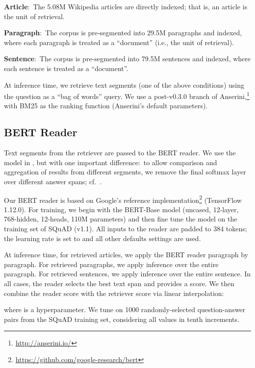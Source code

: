 \documentclass[11pt,a4paper]{article}
\begin{document}
\smallskip \noindent \textbf{Article}:\ The 5.08M Wikipedia articles are directly indexed; that is, an article is the unit of retrieval.

\smallskip \noindent \textbf{Paragraph}:\ The corpus is pre-segmented into 29.5M paragraphs and indexed, where each paragraph is treated as a ``document'' (i.e., the unit of retrieval).

\smallskip \noindent \textbf{Sentence}:\ The corpus is pre-segmented into 79.5M sentences and indexed, where each sentence is treated as a ``document''.

\smallskip \noindent At inference time, we retrieve  text segments (one of the above conditions) using the question as a ``bag of words'' query.
We use a post-v0.3.0 branch of Anserini,\footnote{\url{http://anserini.io/}} with BM25 as the ranking function (Anserini's default parameters).

\subsection{BERT Reader}

Text segments from the retriever are passed to the BERT reader.
We use the model in \citet{devlin2018bert}, but with one important difference:\ to allow comparison and aggregation of results from different segments, we remove the final softmax layer over different answer spans; cf.~\cite{P18-1078}.

Our BERT reader is based on Google's reference implementation\footnote{\url{https://github.com/google-research/bert}} (TensorFlow 1.12.0).
For training, we begin with the BERT-Base model (uncased, 12-layer, 768-hidden, 12-heads, 110M parameters) and then fine tune the model on the training set of SQuAD (v1.1).
All inputs to the reader are padded to 384 tokens; the learning rate is set to  and all other defaults settings are used.

At inference time, for retrieved articles, we apply the BERT reader paragraph by paragraph.
For retrieved paragraphs, we apply inference over the entire paragraph.
For retrieved sentences, we apply inference over the entire sentence.
In all cases, the reader selects the best text span and provides a score.
We then combine the reader score with the retriever score via linear interpolation:

where  is a hyperparameter.
We tune  on 1000 randomly-selected question-answer pairs from the SQuAD training set, considering all values in tenth increments.
\end{document}
